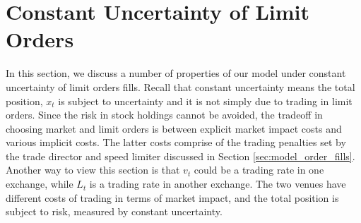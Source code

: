 \documentclass[12pt, letterpaper]{article}
\numberwithin{equation}{section}
\numberwithin{theorem}{section}
\begin{document}
 \section{Constant Uncertainty of Limit Orders}\label{sec:constant_unc}
In this section, we discuss a number of properties of our model under   constant uncertainty of limit orders fills. Recall that constant uncertainty means the total position, $x_t$ is subject to uncertainty and it is not simply due to trading in limit orders. Since the risk in stock holdings cannot be avoided, the tradeoff in choosing market and limit orders is between explicit market impact costs and various implicit costs. The latter costs comprise of the trading penalties set by the trade director and speed limiter discussed in Section \ref{sec:model_order_fills}. Another way to view this section is that $v_t$ could be a trading rate in one exchange, while $L_t$ is a trading rate in another exchange. The two venues have different costs of trading  in terms of market impact, and the total position is subject to risk, measured by constant uncertainty. 
\end{document}
